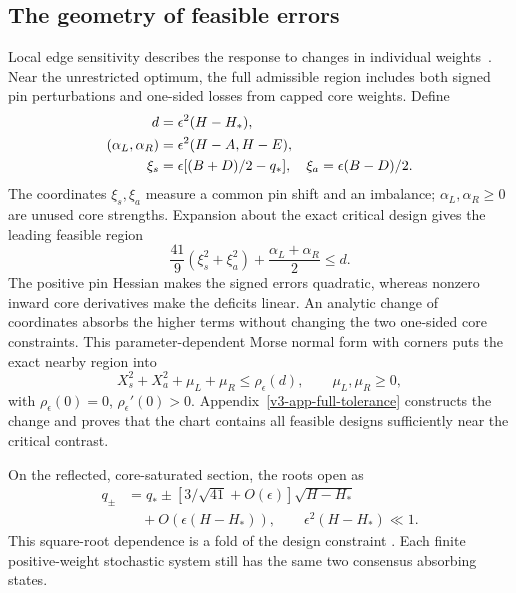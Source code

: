 \documentclass[aps,pre,reprint,amsmath,amssymb,longbibliography]{revtex4-2}
\begin{document}
\subsection{The geometry of feasible errors}
\label{sec:finite-budget-fold-v2}
Local edge sensitivity describes the response to changes in individual
weights~\cite{MengMasuda2023}. Near the unrestricted optimum, the
full admissible region includes both signed pin perturbations and
one-sided losses from capped core weights. Define
 \begin{align}
 d&=\epsilon^2(H-H_*), \notag \\
 (\alpha_L,\alpha_R)&=\epsilon^2(H-A,H-E), \label{eq:v3-main-error-coordinates} 
\\
 \xi_s&=\epsilon[(B+D)/2-q_*],\quad
 \xi_a=\epsilon(B-D)/2.\notag
 \end{align}
The coordinates $\xi_s,\xi_a$ measure a common pin shift and an
imbalance; $\alpha_L,\alpha_R\ge0$ are unused core strengths.
Expansion about the exact critical design gives the leading feasible region
\begin{equation}
 \frac{41}{9}(\xi_s^2+\xi_a^2)
       +\frac{\alpha_L+\alpha_R}{2}\le d.
 \label{eq:v3-main-tolerance}
\end{equation}
The positive pin Hessian makes the signed errors quadratic, whereas
nonzero inward core derivatives make the deficits linear. An analytic change of coordinates absorbs the higher terms without
changing the two one-sided core constraints. This parameter-dependent
Morse normal form with corners puts the exact nearby region into
\begin{equation}
 X_s^2+X_a^2+\mu_L+\mu_R\le\rho_\epsilon(d),\qquad
 \mu_L,\mu_R\ge0,
 \label{eq:v4-morse-corner}
\end{equation}
with $\rho_\epsilon(0)=0$, $\rho_\epsilon'(0)>0$.
Appendix~\ref{v3-app-full-tolerance} constructs the change and proves
that the chart contains all feasible designs sufficiently near the
critical contrast.

On the reflected, core-saturated section, the roots open as
\begin{equation}
 \begin{aligned}
 q_\pm&=q_*\pm[3/\sqrt{41}+O(\epsilon)]\sqrt{H-H_*}\\
 &\quad+O\!\left(\epsilon(H-H_*)\right),
 \qquad \epsilon^2(H-H_*)\ll1.
 \end{aligned}
 \label{eq:finite-budget-width-v2}
\end{equation}
This square-root dependence is a fold of the design constraint
\cite{PriorityKuznetsov2006}. Each finite positive-weight stochastic
system still has the same two consensus absorbing states.
\end{document}
